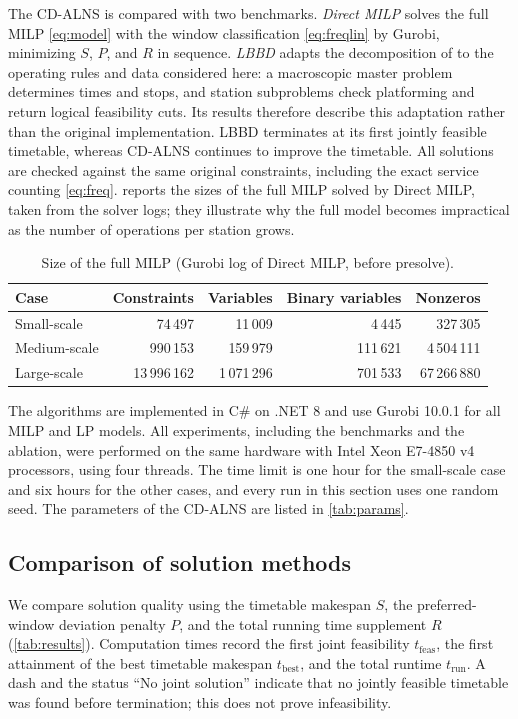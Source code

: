 The CD-ALNS is compared with two benchmarks. \emph{Direct MILP} solves the full MILP \eqref{eq:model} with the window classification \eqref{eq:freqlin} by Gurobi, minimizing $S$, $P$, and $R$ in sequence. \emph{LBBD} adapts the decomposition of \citet{Leutwiler2022} to the operating rules and data considered here: a macroscopic master problem determines times and stops, and station subproblems check platforming and return logical feasibility cuts. Its results therefore describe this adaptation rather than the original implementation. LBBD terminates at its first jointly feasible timetable, whereas CD-ALNS continues to improve the timetable. All solutions are checked against the same original constraints, including the exact service counting \eqref{eq:freq}.  reports the sizes of the full MILP solved by Direct MILP, taken from the solver logs; they illustrate why the full model becomes impractical as the number of operations per station grows.

\begin{table}[tb]
\centering\small
\caption{Size of the full MILP (Gurobi log of Direct MILP, before presolve).}\label{tab:size}
\begin{tabular}{@{}lrrrr@{}}\toprule
Case & Constraints & Variables & Binary variables & Nonzeros\\\midrule
Small-scale & 74\,497 & 11\,009 & 4\,445 & 327\,305\\
Medium-scale & 990\,153 & 159\,979 & 111\,621 & 4\,504\,111\\
Large-scale & 13\,996\,162 & 1\,071\,296 & 701\,533 & 67\,266\,880\\\bottomrule
\end{tabular}
\end{table}

The algorithms are implemented in C\# on .NET 8 and use Gurobi 10.0.1 for all MILP and LP models. All experiments, including the benchmarks and the ablation, were performed on the same hardware with Intel Xeon E7-4850 v4 processors, using four threads. The time limit is one hour for the small-scale case and six hours for the other cases, and every run in this section uses one random seed. The parameters of the CD-ALNS are listed in \cref{tab:params}.

\subsection{Comparison of solution methods}\label{sec:compare}
We compare solution quality using the timetable makespan $S$, the preferred-window deviation penalty $P$, and the total running time supplement $R$ (\cref{tab:results}). Computation times record the first joint feasibility $t_{\mathrm{feas}}$, the first attainment of the best timetable makespan $t_{\mathrm{best}}$, and the total runtime $t_{\mathrm{run}}$. A dash and the status ``No joint solution'' indicate that no jointly feasible timetable was found before termination; this does not prove infeasibility.

